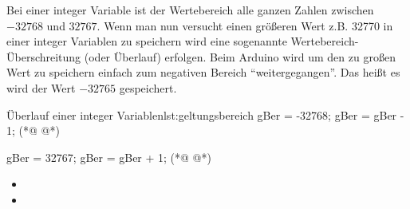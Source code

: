 %


Bei einer integer Variable ist der Wertebereich alle ganzen Zahlen zwischen $-32768$ und $32767$. Wenn man nun versucht einen größeren Wert z.B. 32770 in einer integer Variablen zu speichern wird eine sogenannte Wertebereich-Überschreitung (oder Überlauf) erfolgen. Beim Arduino wird um den zu großen Wert zu speichern einfach zum negativen Bereich ``weitergegangen''. Das heißt es wird der Wert $-32765$ gespeichert.
\begin{multicols}{2}
\null\vfill    
\begin{arduinoCode}{Überlauf einer integer Variablen}{lst:geltungsbereich}
  gBer = -32768; 
  gBer = gBer - 1;  (*@  @*)
  
  gBer = 32767;
  gBer = gBer + 1;  (*@  @*)
  
\end{arduinoCode}
\vfill\null 
\columnbreak

\null\vfill
\begin{itemize}
  \itemsep15pt
  \item[] 
  \item[] 
\end{itemize}
\vfill \null

\end{multicols}

